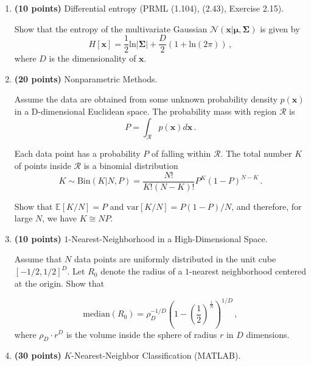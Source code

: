 \documentclass[12pt,twoside]{article}
\begin{document}
\begin{enumerate}
\medskip
\medskip

\item {\bf (10 points)} Differential entropy (PRML (1.104), (2.43), Exercise 2.15).

Show that the entropy of the multivariate Gaussian $\mathcal{N}(\mathbf{x}|\boldsymbol{\mu}, \boldsymbol{\Sigma})$ is given by 
\[
H[\mathbf{x}] = \frac{1}{2} \mathrm{ln} \left| \boldsymbol{\Sigma} \right| +\frac{D}{2} \left( 1 + \mathrm{ln}(2 \pi)  \right) \,,
\]
\noindent where $D$ is the dimensionality of $\mathbf{x}$.
  
  
\medskip
\medskip

\item {\bf (20 points)} Nonparametric Methods.

Assume the data are obtained from some unknown probability density $p(\mathbf{x})$ in a D-dimensional Euclidean space. The probability mass with region $\mathcal{R}$ is
\[
P = \int_{\mathcal{R}} p(\mathbf{x}) d \mathbf{x} \,.
\]
 
Each data point has a probability $P$ of falling within $\mathcal{R}$. The total number $K$ of points inside $\mathcal{R}$ is a binomial distribution
\[
K \sim \mathrm{Bin}(K|N, P) = \frac{N!}{K!(N-K)!} P^K (1-P)^{N-K} \,.
\]
 
Show that $\mathbb{E}[K/N] = P$ and $\mathrm{var}[K/N] = P(1-P)/N$, and therefore, for large $N$, we have $K\cong NP$.
 


\medskip
\medskip

\item {\bf (10 points)} $1$-Nearest-Neighborhood in a High-Dimensional Space.

Assume that $N$ data points are uniformly distributed in the unit cube $[-1/2, 1/2]^D$. Let $R_0$ denote the radius of a $1$-nearest neighborhood centered at the origin. Show that

\[
\mathrm{median}(R_0) = \rho_D^{-1/D} \left(1-\left(\frac{1}{2}\right)^{\frac{1}{N}} \right)^{1/D} \,,
\]
\noindent where $\rho_D \cdot r^D$ is the volume inside the sphere of radius $r$ in $D$ dimensions.




\medskip
\medskip

\item {\bf (30 points)} $K$-Nearest-Neighbor Classification (MATLAB).


\end{enumerate}
\end{document}
